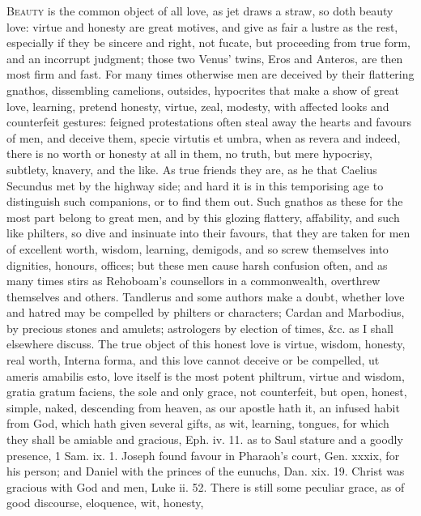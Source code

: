 {\lettrine{B}{eauty} is the common object of all love, as jet draws a straw, so
doth beauty love: virtue and honesty are great motives, and give as
fair a lustre as the rest, especially if they be sincere and right, not
fucate, but proceeding from true form, and an incorrupt judgment; those
two Venus' twins, Eros and Anteros, are then most firm and fast. For
many times otherwise men are deceived by their flattering gnathos,
dissembling camelions, outsides, hypocrites that make a show of great
love, learning, pretend honesty, virtue, zeal, modesty, with affected
looks and counterfeit gestures: feigned protestations often steal away
the hearts and favours of men, and deceive them, specie virtutis et
umbra, when as revera and indeed, there is no worth or honesty at all
in them, no truth, but mere hypocrisy, subtlety, knavery, and the like.
As true friends they are, as he that Caelius Secundus met by the
highway side; and hard it is in this temporising age to distinguish
such companions, or to find them out. Such gnathos as these for the
most part belong to great men, and by this glozing flattery,
affability, and such like philters, so dive and insinuate into their
favours, that they are taken for men of excellent worth, wisdom,
learning, demigods, and so screw themselves into dignities, honours,
offices; but these men cause harsh confusion often, and as many times
stirs as Rehoboam's counsellors in a commonwealth, overthrew themselves
and others. Tandlerus and some authors make a doubt, whether love and
hatred may be compelled by philters or characters; Cardan and
Marbodius, by precious stones and amulets; astrologers by election of
times, \&c. as I shall elsewhere discuss. The true object of this
honest love is virtue, wisdom, honesty, real worth, Interna
forma, and this love cannot deceive or be compelled, ut ameris amabilis
esto, love itself is the most potent philtrum, virtue and wisdom,
gratia gratum faciens, the sole and only grace, not counterfeit, but
open, honest, simple, naked, descending from heaven, as our
apostle hath it, an infused habit from God, which hath given several
gifts, as wit, learning, tongues, for which they shall be amiable and
gracious, Eph. iv. 11. as to Saul stature and a goodly presence, 1 Sam.
ix. 1. Joseph found favour in Pharaoh's court, Gen. xxxix, for
his person; and Daniel with the princes of the eunuchs, Dan. xix.
19. Christ was gracious with God and men, Luke ii. 52. There is still
some peculiar grace, as of good discourse, eloquence, wit, honesty,
}
